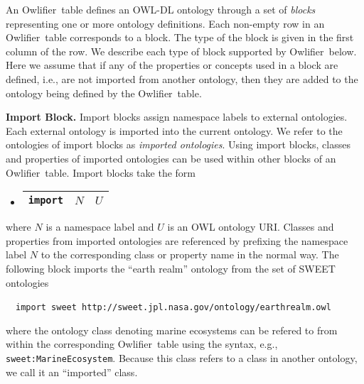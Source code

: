 \documentclass[preprint,number]{elsarticle}
\newcommand{\owlifier}{\textsf{Owlifier}}
\newcommand{\mypara}[1]{\vspace{12pt}\noindent\textbf{#1}}
\begin{document}
An \owlifier\ table defines an OWL-DL
\cite{smith04:_owl_web_ontol_languag_guide} ontology through a set of
\emph{blocks} representing one or more ontology definitions.  Each
non-empty row in an \owlifier\ table corresponds to a block. The type
of the block is given in the first column of the row. We describe each
type of block supported by \owlifier\ below. Here we assume that if
any of the properties or concepts used in a block are defined, i.e.,
are not imported from another ontology, then they are added to the
ontology being defined by the \owlifier\ table.

\mypara{Import Block.} Import blocks assign namespace labels to
external ontologies. Each external ontology is imported into the
current ontology. We refer to the ontologies of import blocks as
\emph{imported ontologies}.  Using import blocks, classes and
properties of imported ontologies can be used within other blocks of
an \owlifier\ table.  Import blocks take the form
\begin{itemize}
\item[]
  \begin{tabular}{|l|l|l|}\hline
    \texttt{import} & $\textit{N}$ & $\textit{U}$ \\ \hline 
  \end{tabular} 
\end{itemize}
where $\textit{N}$ is a namespace label and $\textit{U}$ is an OWL
ontology URI. Classes and properties from imported ontologies are
referenced by prefixing the namespace label $\textit{N}$ to the
corresponding class or property name in the normal way. The following
block imports the ``earth realm'' ontology from the set of SWEET
ontologies \cite{raskin:_seman_web_for_earth_and}
\begin{tabbing}
  ~~\texttt{import sweet
    http://sweet.jpl.nasa.gov/ontology/earthrealm.owl}
\end{tabbing}
where the ontology class denoting marine ecosystems can be refered to
from within the corresponding \owlifier\ table using the syntax, e.g.,
\sloppy\texttt{sweet:MarineEcosystem}. Because this class refers to a
class in another ontology, we call it an ``imported'' class.
\end{document}
